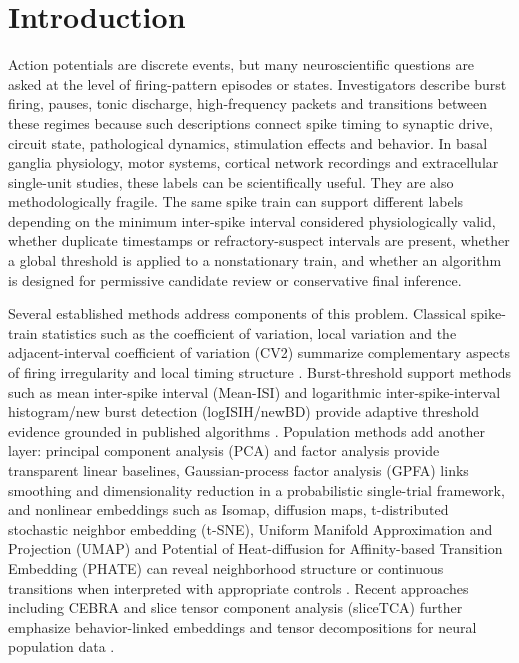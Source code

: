 \documentclass[pdflatex,sn-apa]{sn-jnl}
\begin{document}
\section{Introduction}

Action potentials are discrete events, but many neuroscientific questions are asked at the level of firing-pattern episodes or states. Investigators describe burst firing, pauses, tonic discharge, high-frequency packets and transitions between these regimes because such descriptions connect spike timing to synaptic drive, circuit state, pathological dynamics, stimulation effects and behavior. In basal ganglia physiology, motor systems, cortical network recordings and extracellular single-unit studies, these labels can be scientifically useful. They are also methodologically fragile. The same spike train can support different labels depending on the minimum inter-spike interval considered physiologically valid, whether duplicate timestamps or refractory-suspect intervals are present, whether a global threshold is applied to a nonstationary train, and whether an algorithm is designed for permissive candidate review or conservative final inference.

Several established methods address components of this problem. Classical spike-train statistics such as the coefficient of variation, local variation and the adjacent-interval coefficient of variation (CV2) summarize complementary aspects of firing irregularity and local timing structure \citep{Holt1996,Shinomoto2005}. Burst-threshold support methods such as mean inter-spike interval (Mean-ISI) and logarithmic inter-spike-interval histogram/new burst detection (logISIH/newBD) provide adaptive threshold evidence grounded in published algorithms \citep{Chen2009,Pasquale2010}. Population methods add another layer: principal component analysis (PCA) and factor analysis provide transparent linear baselines, Gaussian-process factor analysis (GPFA) links smoothing and dimensionality reduction in a probabilistic single-trial framework, and nonlinear embeddings such as Isomap, diffusion maps, t-distributed stochastic neighbor embedding (t-SNE), Uniform Manifold Approximation and Projection (UMAP) and Potential of Heat-diffusion for Affinity-based Transition Embedding (PHATE) can reveal neighborhood structure or continuous transitions when interpreted with appropriate controls \citep{Tenenbaum2000,Coifman2006,VanDerMaaten2008,McInnes2018,Moon2019,Yu2009,Cunningham2014}. Recent approaches including CEBRA and slice tensor component analysis (sliceTCA) further emphasize behavior-linked embeddings and tensor decompositions for neural population data \citep{Schneider2023,Pellegrino2024}.
\end{document}
